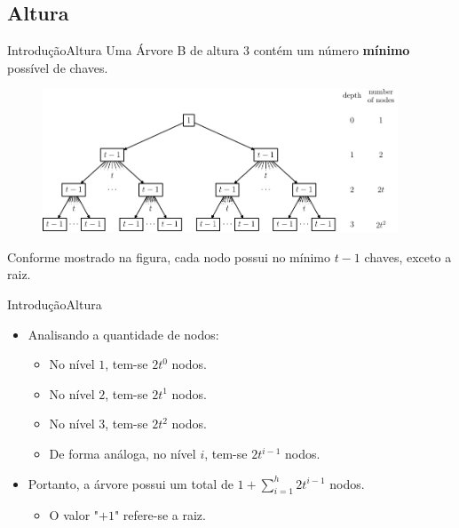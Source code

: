 \documentclass[aspectratio=169]{beamer}
\begin{document}
\subsection{Altura}

\begin{frame}{Introdução}{Altura}
Uma Árvore B de altura 3 contém um número {\bf mínimo} possível de chaves.
\begin{figure}[!h]
\centering
   \includegraphics[width=300pt]{imagens/altura.png}
  \label{fig_altura}
\end{figure}
Conforme mostrado na figura, cada nodo possui no mínimo $t-1$ chaves, exceto a raiz.
\end{frame}


\begin{frame}{Introdução}{Altura}
\begin{itemize}
\item Analisando a quantidade de nodos:
\begin{itemize}
\item No nível $1$, tem-se $2t^{0}$ nodos.
\item No nível $2$, tem-se $2t^{1}$ nodos.
\item No nível $3$, tem-se $2t^{2}$ nodos.
\item De forma análoga, no nível $i$, tem-se $2 t^{i-1}$ nodos.
\end{itemize}
\item Portanto, a árvore possui um total de $1 + \sum_{i=1}^h 2 t^{i-1}$ nodos.
\begin{itemize}
\item O valor "$+1$" refere-se a raiz.
\end{itemize}
\end{itemize}
\end{frame}
\end{document}

